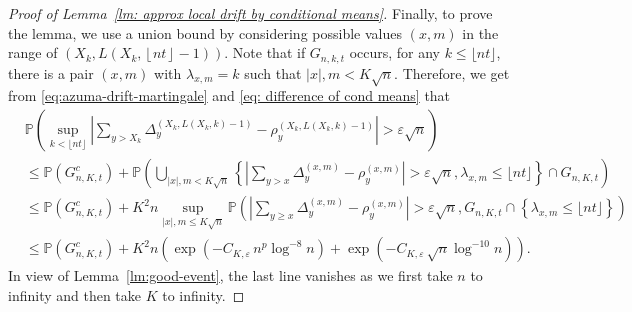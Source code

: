 \documentclass[EJP]{ejpecp} %
\newcommand{\abs}[1]{\left\vert #1 \right\vert}
\begin{document}
\begin{proof}[Proof of Lemma~\ref{lm: approx local drift by conditional means}]
Finally, to prove the lemma, we use a union bound by considering possible values $(x,m)$ in the range of $\left(X_k, L\left(X_k, \left\lfloor nt  \right\rfloor - 1\right)\right)$. Note that if $G_{n,k,t}$ occurs, for any $k\leq \lfloor nt \rfloor$, there is a pair $(x,m)$ with $\lambda_{x,m}=k$ such that $\abs{x},m <K\sqrt{n}$. Therefore, we get from \eqref{eq:azuma-drift-martingale} and \eqref{eq: difference of cond means} that 
\begin{align*}
	& \mathbb{P}\left( \sup_{k <\lfloor nt \rfloor} \left| \sum_{y > X_k} 
	\Delta_y^{\left(X_k,L(X_k, k)-1\right)} - \rho_y^{\left(X_k,L(X_k, k)-1\right)}
	\right| > \varepsilon \sqrt{n}  \right) \\
	&\le \mathbb{P}(G_{n, K, t}^c) + \mathbb{P}\left( \bigcup_{|x|, m < K \sqrt{n} } \left\{  \left| \sum_{y > x} \Delta_y^{(x,m)} - \rho_y^{(x,m)} \right|  > \varepsilon \sqrt{n},  \lambda_{x,m} \leq\lfloor nt \rfloor \right\} \cap G_{n,K,t} \right) \\
	&\le \mathbb{P}(G_{n, K, t}^c) + K^2 n \sup _{|x|, m \le  K \sqrt{n} }
	\mathbb{P}\left( \left| \sum_{y \ge x} \Delta_y^{(x,m)} - \rho_y^{(x,m)} \right|  > \varepsilon \sqrt{n} , G_{n,K,t}\cap \left\{\lambda_{x,m} \leq\lfloor nt \rfloor \right\}  \right) \\
	&\le \mathbb{P}(G_{n, K, t}^c) + K^2 n \left( \exp\left( - C_{K, \varepsilon} \, n^{p } \log^{-8} n \right) + \exp\left( - C_{K, \varepsilon} \, \sqrt{n}  \log^{-10} n \right)\right) 
	.\end{align*}
In view of Lemma~\ref{lm:good-event}, the last line vanishes as we first take $n$ to infinity and then take $K$ to infinity.
\end{proof}



\end{document}
